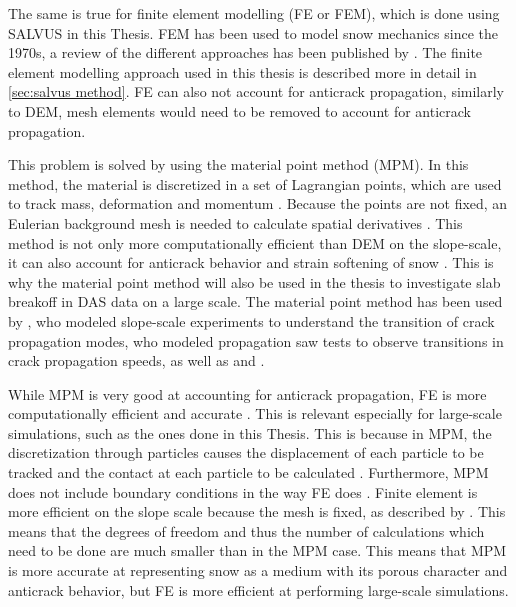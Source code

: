 The same is true for finite element modelling (FE or FEM), which is done using SALVUS in this Thesis. FEM has been used to model snow mechanics since the 1970s, a review of the different approaches has been published by \cite{podolskiyReviewFiniteelementModelling2013}. The finite element modelling approach used in this thesis is described more in detail in \ref{sec:salvus method}. FE can also not account for anticrack propagation, similarly to DEM, mesh elements would need to be removed to account for anticrack propagation. \par

This problem is solved by using the material point method (MPM). In this method, the material is discretized in a set of Lagrangian points, which are used to track mass, deformation and momentum \parencite{bardenhagenMaterialpointMethodGranular2000}. Because the points are not fixed, an Eulerian background mesh is needed to calculate spatial derivatives \parencite{bardenhagenMaterialpointMethodGranular2000}. This method is not only more computationally efficient than DEM on the slope-scale, it can also account for anticrack behavior and strain softening of snow \parencite{gaumeInvestigatingReleaseFlow2019}. This is why the material point method will also be used in the thesis to investigate slab breakoff in DAS data on a large scale. The material point method has been used by \cite{bergfeldSignaturesSubRayleighSupershear2025}, who modeled slope-scale experiments to understand the transition of crack propagation modes, \cite{trottetTransitionSubRayleighAnticrack2022} who modeled propagation saw tests to observe transitions in crack propagation speeds, as well as \cite{gaumeInvestigatingReleaseFlow2019} and \cite{gaumeDynamicAnticrackPropagation2018}. \par

While MPM is very good at accounting for anticrack propagation, FE is more computationally efficient and accurate \cite{lianAdaptiveFiniteElement2012}. This is relevant especially for large-scale simulations, such as the ones done in this Thesis. This is because in MPM, the discretization through particles causes the displacement of each particle to be tracked and the contact at each particle to be calculated \parencite{zhangModellingLargescaleLandslide2023}. Furthermore, MPM does not include boundary conditions in the way FE does \parencite{coombsImmersedFEMMPM2025}. Finite element is more efficient on the slope scale because the mesh is fixed, as described by \parencite{FiniteElementMethod}. This means that the degrees of freedom and thus the number of calculations which need to be done are much smaller than in the MPM case. This means that MPM is more accurate at representing snow as a medium with its porous character and anticrack behavior, but FE is more efficient at performing large-scale simulations. \par


